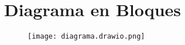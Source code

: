 \documentclass[../informe_krapp.tex]{subfiles}
\begin{document}
\section{Diagrama en Bloques}
\begin{figure}[H]
	\texttt{[image: diagrama.drawio.png]}
	\centering
\end{figure}
\clearpage
\end{document}
